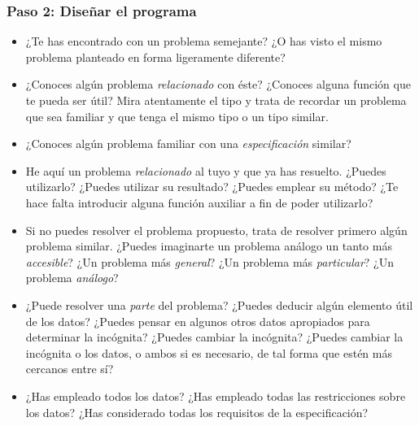 \subsubsection*{Paso 2: Diseñar el programa}
\begin{itemize}
\item ¿Te has encontrado con un problema semejante? ¿O has visto el mismo
  problema planteado en forma ligeramente diferente? 
\item ¿Conoces algún problema \emph{relacionado} con éste? ¿Conoces alguna
  función que te pueda ser útil? Mira atentamente el tipo y trata de recordar un
  problema que sea familiar y que tenga el mismo tipo o un tipo similar. 
\item ¿Conoces algún problema familiar con una \emph{especificación} similar? 
\item He aquí un problema \emph{relacionado} al tuyo y que ya has
  resuelto. ¿Puedes utilizarlo? ¿Puedes utilizar su resultado? ¿Puedes emplear
  su método? ¿Te hace falta introducir alguna función auxiliar a fin de poder
  utilizarlo?  
\item Si no puedes resolver el problema propuesto, trata de resolver primero
  algún problema similar. ¿Puedes imaginarte un problema análogo un
  tanto más \emph{accesible}? ¿Un problema más \emph{general}? ¿Un problema más
  \emph{particular}? ¿Un problema \emph{análogo}? 
\item ¿Puede resolver una \emph{parte} del problema? ¿Puedes deducir algún
  elemento útil de los datos? ¿Puedes pensar en algunos otros datos apropiados
  para determinar la incógnita? ¿Puedes cambiar la incógnita? ¿Puedes cambiar la
  incógnita o los datos, o ambos si es necesario, de tal forma que estén más
  cercanos entre sí? 
\item ¿Has empleado todos los datos? ¿Has empleado todas las restricciones
  sobre los datos? ¿Has considerado todas los requisitos de la especificación?
\end{itemize}


